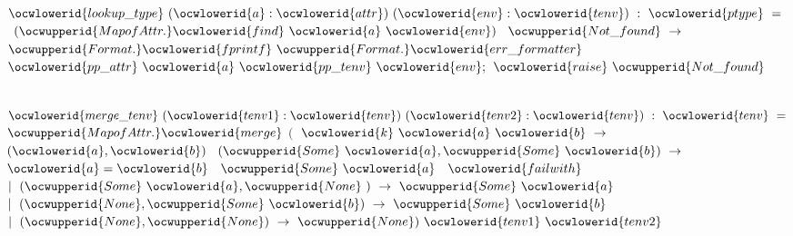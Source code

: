 \documentclass[12pt]{article}
\begin{document}
\label{rellens.ml:2279}%
\ocwindent{0.00em}
~$\ocwlowerid{lookup\_type}~(\ocwlowerid{a}:\ocwlowerid{attr})~(\ocwlowerid{env}:\ocwlowerid{tenv})~:~\ocwlowerid{ptype}~=~$\ocweol
\ocwindent{1.50em}
~$(\ocwupperid{MapofAttr.}\ocwlowerid{find}~\ocwlowerid{a}~\ocwlowerid{env})~$\ocweol
\ocwindent{2.50em}
$\ocwupperid{Not\_found}~\rightarrow{}$\ocweol
\ocwindent{3.50em}
$\ocwupperid{Format.}\ocwlowerid{fprintf}~\ocwupperid{Format.}\ocwlowerid{err\_formatter}~$~\ocweol
\ocwindent{4.50em}
$\ocwlowerid{pp\_attr}~\ocwlowerid{a}~\ocwlowerid{pp\_tenv}~\ocwlowerid{env};$\ocweol
\ocwindent{3.50em}
$\ocwlowerid{raise}~\ocwupperid{Not\_found}$\medskip

\label{rellens.ml:2516}%
\ocwindent{0.00em}
~$\ocwlowerid{merge\_tenv}~(\ocwlowerid{tenv1}:\ocwlowerid{tenv})~(\ocwlowerid{tenv2}:\ocwlowerid{tenv})~:~\ocwlowerid{tenv}~=$\ocweol
\ocwindent{1.00em}
$\ocwupperid{MapofAttr.}\ocwlowerid{merge}$\ocweol
\ocwindent{2.50em}
$($~$\ocwlowerid{k}~\ocwlowerid{a}~\ocwlowerid{b}~\rightarrow{}~$~$(\ocwlowerid{a},\ocwlowerid{b})~$\ocweol
\ocwindent{3.50em}
$(\ocwupperid{Some}~\ocwlowerid{a},\ocwupperid{Some}~\ocwlowerid{b})~\rightarrow{}~$~$\ocwlowerid{a}=\ocwlowerid{b}~$~$\ocwupperid{Some}~\ocwlowerid{a}~$~$\ocwlowerid{failwith}~$\ocweol
\ocwindent{2.50em}
$\mid{}~(\ocwupperid{Some}~\ocwlowerid{a},\ocwupperid{None}~)~\rightarrow{}~\ocwupperid{Some}~\ocwlowerid{a}$\ocweol
\ocwindent{2.50em}
$\mid{}~(\ocwupperid{None},\ocwupperid{Some}~\ocwlowerid{b})~\rightarrow{}~\ocwupperid{Some}~\ocwlowerid{b}$\ocweol
\ocwindent{2.50em}
$\mid{}~(\ocwupperid{None},\ocwupperid{None})~\rightarrow{}~\ocwupperid{None})~\ocwlowerid{tenv1}~\ocwlowerid{tenv2}$\medskip
\end{document}
